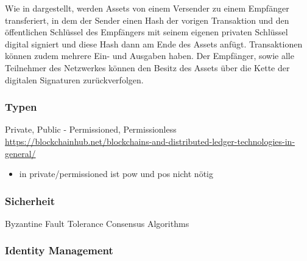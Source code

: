 	    Wie in  dargestellt, werden Assets von einem Versender zu einem Empfänger transferiert, in dem der Sender einen Hash der vorigen Transaktion und den öffentlichen Schlüssel des Empfängers mit seinem eigenen privaten Schlüssel digital signiert und diese Hash dann am Ende des Assets anfügt.
	    Transaktionen können zudem mehrere Ein- und Ausgaben haben\cite{Nakamoto2008}.
	    Der Empfänger, sowie alle Teilnehmer des Netzwerkes können den Besitz des Assets über die Kette der digitalen Signaturen zurückverfolgen\cite{Nakamoto2008}.
    
    
    \begin{figure}[H]
    \end{figure}
    
    \subsubsection{Typen}
        Private, Public - Permissioned, Permissionless
        \sloppy\url{https://blockchainhub.net/blockchains-and-distributed-ledger-technologies-in-general/}
        \begin{itemize}[noitemsep]
            \item in private/\-permissioned ist \gls{pow} und \gls{pos} nicht nötig
        \end{itemize}
    
    \subsubsection{Sicherheit}
    \label{sec:sota_blockchain_security}
        Byzantine Fault Tolerance
        Consensus Algorithms
    
    \subsubsection{Identity Management}
    \label{sec:sota_blockchain_identitymgmnt}
